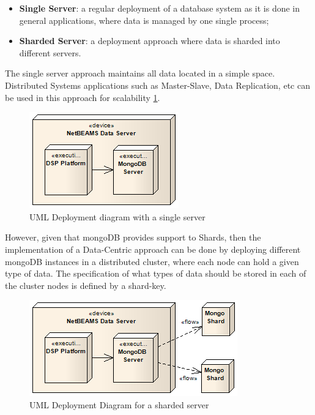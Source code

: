 \begin{itemize}
  \item \textbf{Single Server}: a regular deployment of a database system as it
  is done in general applications, where data is managed by one single process;
  \item \textbf{Sharded Server}: a deployment approach where data is sharded
  into different servers.
\end{itemize} 

The single server approach maintains all data located in a simple space.
Distributed Systems applications such as Master-Slave, Data Replication, etc
can be used in this approach for scalability
\ref{fig:DSP-Data-Persistence-Deployment-Single}. 

\begin{figure}[!b]
  \centering
  \includegraphics[scale=0.7]{../diagrams/DSP-Data-Persistence-Deployment-Single}
  \caption{UML Deployment diagram with a single server}
  \label{fig:DSP-Data-Persistence-Deployment-Single}
\end{figure}

However, given that mongoDB provides support to Shards, then the implementation
of a Data-Centric approach can be done by deploying different mongoDB instances
in a distributed cluster, where each node can hold a given type of data. The
specification of what types of data should be stored in each of the cluster
nodes is defined by a shard-key.

\begin{figure}[!b]
  \centering
  \includegraphics[scale=0.7]{../diagrams/DSP-Data-Persistence-Deployment-Sharded}
  \caption{UML Deployment Diagram for a sharded server}
  \label{fig:DSP-Data-Persistence-Deployment-Sharded}
\end{figure}